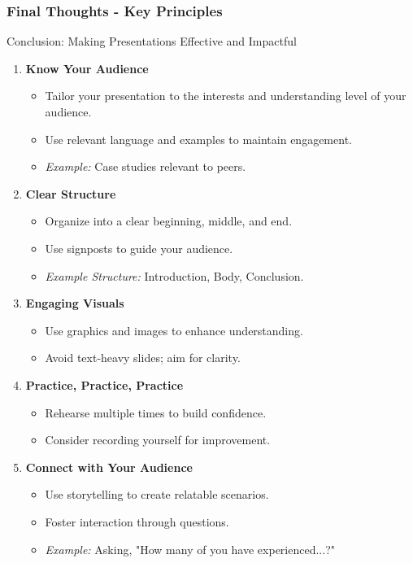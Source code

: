 \documentclass[aspectratio=169]{beamer}
\begin{document}
\begin{frame}[fragile]
    \frametitle{Final Thoughts - Key Principles}
    \begin{block}{Conclusion: Making Presentations Effective and Impactful}
        \begin{enumerate}
            \item \textbf{Know Your Audience}
            \begin{itemize}
                \item Tailor your presentation to the interests and understanding level of your audience.
                \item Use relevant language and examples to maintain engagement.
                \item \textit{Example:} Case studies relevant to peers.
            \end{itemize}
            \item \textbf{Clear Structure}
            \begin{itemize}
                \item Organize into a clear beginning, middle, and end.
                \item Use signposts to guide your audience.
                \item \textit{Example Structure:} Introduction, Body, Conclusion.
            \end{itemize}
            \item \textbf{Engaging Visuals}
            \begin{itemize}
                \item Use graphics and images to enhance understanding.
                \item Avoid text-heavy slides; aim for clarity.
            \end{itemize}
            \item \textbf{Practice, Practice, Practice}
            \begin{itemize}
                \item Rehearse multiple times to build confidence.
                \item Consider recording yourself for improvement.
            \end{itemize}
            \item \textbf{Connect with Your Audience}
            \begin{itemize}
                \item Use storytelling to create relatable scenarios.
                \item Foster interaction through questions.
                \item \textit{Example:} Asking, "How many of you have experienced...?"
            \end{itemize}
        \end{enumerate}
    \end{block}
\end{frame}
\end{document}
